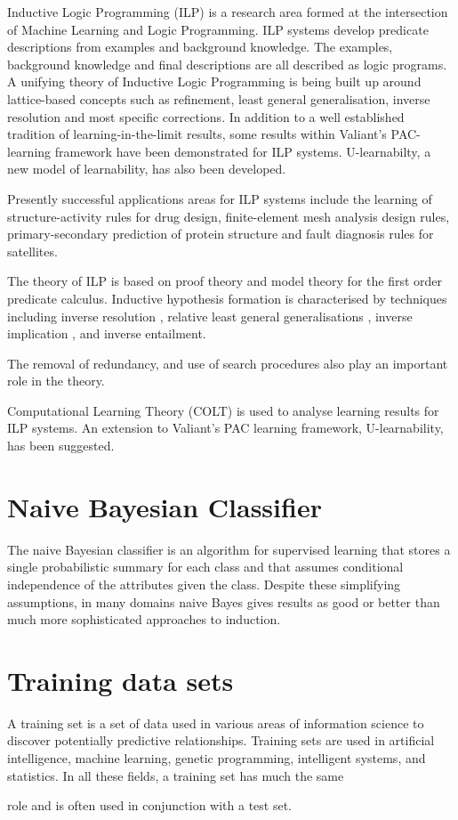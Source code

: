 \documentclass[11pt]{article} %
\begin{document}
Inductive Logic Programming (ILP) is a research area formed at the intersection of Machine Learning and Logic Programming. ILP systems develop predicate descriptions from examples and background knowledge. The examples, background knowledge and final descriptions are all described as logic programs. A unifying theory of Inductive Logic Programming is being built up around lattice-based concepts such as refinement, least general generalisation, inverse resolution and most specific corrections. In addition to a well established tradition of learning-in-the-limit results, some results within Valiant's PAC-learning framework have been demonstrated for ILP systems. U-learnabilty, a new model of learnability, has also been developed.


Presently successful applications areas for ILP systems include the learning of structure-activity rules for drug design, finite-element mesh analysis design rules, primary-secondary prediction of protein structure and fault diagnosis rules for satellites.


The theory of ILP is based on proof theory and model theory for the first order predicate calculus. Inductive hypothesis formation is characterised by techniques including inverse resolution , relative least general generalisations , inverse implication , and inverse entailment.


The removal of redundancy, and use of search procedures also play an important role in the theory.


Computational Learning Theory (COLT) is used to analyse learning results for ILP systems. An extension to Valiant's PAC learning framework, U-learnability, has been suggested.



\section{Naive Bayesian Classifier}

The naive Bayesian classifier is an algorithm for supervised learning that stores a single probabilistic summary for each class and that assumes conditional independence of the attributes given the class. Despite these simplifying assumptions, in many domains naive Bayes gives results as good or better than much more sophisticated approaches to induction. 




\section{Training data sets}

A training set is a set of data used in various areas of information science to discover potentially predictive relationships. Training sets are used in artificial intelligence, machine learning, genetic programming, intelligent systems, and statistics. In all these fields, a training set has much the same 

role and is often used in conjunction with a test set.
\end{document}
